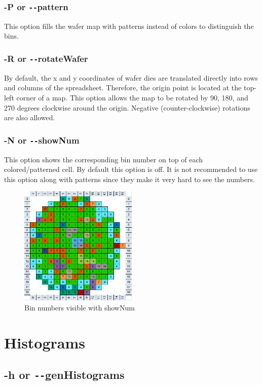 \documentclass[letterpaper]{article}
\begin{document}
\subsubsection{\bf -P or \texttt{-{}-}pattern}
This option fills the wafer map with patterns instead of colors to distinguish the bins.
\subsubsection{\bf -R or \texttt{-{}-}rotateWafer}
By default, the x and y coordinates of wafer dies are translated directly into rows and columns of the spreadsheet. Therefore, the origin point is located at the top-left corner of a map. This option allows the map to be rotated by 90, 180, and 270 degrees clockwise around the origin. Negative (counter-clockwise) rotations are also allowed.
\subsubsection{\bf -N or \texttt{-{}-}showNum}
This option shows the corresponding bin number on top of each colored/patterned cell. By default this option is off. It is not recommended to use this option along with patterns since they make it very hard to see the numbers.
\begin{figure}[H]
	\centering
	\includegraphics[width=0.5\textwidth]{showNum.png}
	\caption{Bin numbers visible with showNum}
	\label{fig:showNum}
\end{figure}

\section{\bf Histograms}
\subsection{\bf -h or \texttt{-{}-}genHistograms}
\end{document}
